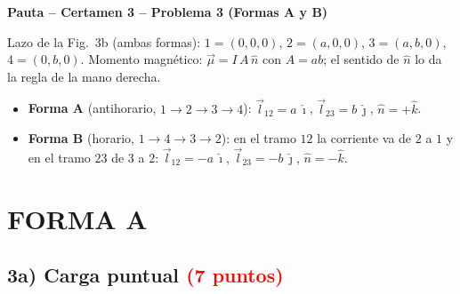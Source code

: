 \documentclass[12pt,letterpaper]{article}
\begin{document}
\begin{center}
    {\Large\textbf{Pauta -- Certamen 3 -- Problema 3 (Formas A y B)}}
\end{center}

\begin{center}
\end{center}

Lazo de la Fig.~3b (ambas formas): $1=(0,0,0)$, $2=(a,0,0)$, $3=(a,b,0)$, $4=(0,b,0)$.
Momento magn\'etico: $\vec{\mu} = I\,A\,\hat{n}$ con $A = ab$; el sentido de $\hat{n}$ lo da la regla de la
mano derecha.
\begin{itemize}
    \item \textbf{Forma A} (antihorario, $1\to2\to3\to4$): $\vec{l}_{12} = a\,\hat{\imath}$,
          $\vec{l}_{23} = b\,\hat{\jmath}$, $\hat{n} = +\hat{k}$.
    \item \textbf{Forma B} (horario, $1\to4\to3\to2$): en el tramo $12$ la corriente va de $2$ a $1$
          y en el tramo $23$ de $3$ a $2$: $\vec{l}_{12} = -a\,\hat{\imath}$,
          $\vec{l}_{23} = -b\,\hat{\jmath}$, $\hat{n} = -\hat{k}$.
\end{itemize}

\section*{FORMA A}

\subsection*{3a) Carga puntual \quad\textcolor{red}{(7 puntos)}}
\end{document}
